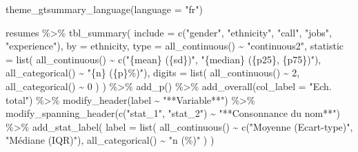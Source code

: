 \documentclass[
  11pt,
]{book}
\newenvironment{Shaded}{\begin{snugshade}}{\end{snugshade}}
\newcommand{\AttributeTok}[1]{\textcolor[rgb]{0.77,0.63,0.00}{#1}}
\newcommand{\DecValTok}[1]{\textcolor[rgb]{0.00,0.00,0.81}{#1}}
\newcommand{\FunctionTok}[1]{\textcolor[rgb]{0.00,0.00,0.00}{#1}}
\newcommand{\NormalTok}[1]{#1}
\newcommand{\SpecialCharTok}[1]{\textcolor[rgb]{0.00,0.00,0.00}{#1}}
\newcommand{\StringTok}[1]{\textcolor[rgb]{0.31,0.60,0.02}{#1}}
\numberwithin{equation}{section}
\numberwithin{countremarque}{section}
\begin{document}
\begin{Shaded}
\begin{Highlighting}[]
\FunctionTok{theme\_gtsummary\_language}\NormalTok{(}\AttributeTok{language =} \StringTok{"fr"}\NormalTok{)}
\end{Highlighting}
\end{Shaded}

\begin{Shaded}
\begin{Highlighting}[]
\NormalTok{resumes }\SpecialCharTok{\%\textgreater{}\%}
  \FunctionTok{tbl\_summary}\NormalTok{(}
    \AttributeTok{include =} \FunctionTok{c}\NormalTok{(}\StringTok{"gender"}\NormalTok{, }\StringTok{"ethnicity"}\NormalTok{, }\StringTok{"call"}\NormalTok{, }\StringTok{"jobs"}\NormalTok{, }\StringTok{"experience"}\NormalTok{),}
    \AttributeTok{by =}\NormalTok{ ethnicity,}
    \AttributeTok{type =} \FunctionTok{all\_continuous}\NormalTok{() }\SpecialCharTok{\textasciitilde{}} \StringTok{"continuous2"}\NormalTok{,}
    \AttributeTok{statistic =} \FunctionTok{list}\NormalTok{(}
      \FunctionTok{all\_continuous}\NormalTok{() }\SpecialCharTok{\textasciitilde{}} \FunctionTok{c}\NormalTok{(}\StringTok{"\{mean\} (\{sd\})"}\NormalTok{, }\StringTok{"\{median\} (\{p25\}, \{p75\})"}\NormalTok{),}
      \FunctionTok{all\_categorical}\NormalTok{() }\SpecialCharTok{\textasciitilde{}} \StringTok{"\{n\} (\{p\}\%)"}\NormalTok{),}
    \AttributeTok{digits =} \FunctionTok{list}\NormalTok{(}
      \FunctionTok{all\_continuous}\NormalTok{() }\SpecialCharTok{\textasciitilde{}} \DecValTok{2}\NormalTok{,}
      \FunctionTok{all\_categorical}\NormalTok{() }\SpecialCharTok{\textasciitilde{}} \DecValTok{0}
\NormalTok{    )}
\NormalTok{  ) }\SpecialCharTok{\%\textgreater{}\%} 
  \FunctionTok{add\_p}\NormalTok{() }\SpecialCharTok{\%\textgreater{}\%} 
  \FunctionTok{add\_overall}\NormalTok{(}\AttributeTok{col\_label =} \StringTok{"Ech. total"}\NormalTok{) }\SpecialCharTok{\%\textgreater{}\%} 
  \FunctionTok{modify\_header}\NormalTok{(label }\SpecialCharTok{\textasciitilde{}} \StringTok{"**Variable**"}\NormalTok{) }\SpecialCharTok{\%\textgreater{}\%} 
  \FunctionTok{modify\_spanning\_header}\NormalTok{(}\FunctionTok{c}\NormalTok{(}\StringTok{"stat\_1"}\NormalTok{, }\StringTok{"stat\_2"}\NormalTok{) }\SpecialCharTok{\textasciitilde{}} \StringTok{"**Consonnance du nom**"}\NormalTok{) }\SpecialCharTok{\%\textgreater{}\%} 
  \FunctionTok{add\_stat\_label}\NormalTok{(}
    \AttributeTok{label =} \FunctionTok{list}\NormalTok{(}
      \FunctionTok{all\_continuous}\NormalTok{() }\SpecialCharTok{\textasciitilde{}} \FunctionTok{c}\NormalTok{(}\StringTok{"Moyenne (Ecart{-}type)"}\NormalTok{, }\StringTok{"Médiane (IQR)"}\NormalTok{),}
      \FunctionTok{all\_categorical}\NormalTok{() }\SpecialCharTok{\textasciitilde{}} \StringTok{"n (\%)"}
\NormalTok{    )}
\NormalTok{  )}
\end{Highlighting}
\end{Shaded}
\end{document}
